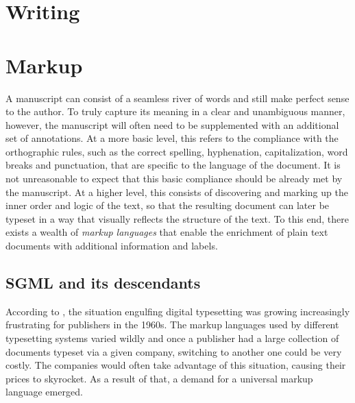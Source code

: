 \documentclass[b5paper]{book}
\begin{document}
    \chapter{Writing}

    \chapter{Markup}
      A manuscript can consist of a seamless river of words and still make
      perfect sense to the author. To truly capture its meaning in a clear and
      unambiguous manner, however, the manuscript will often need to be
      supplemented with an additional set of annotations. At a more basic level,
      this refers to the compliance with the orthographic rules, such as the
      correct spelling, hyphenation, capitalization, word breaks and
      punctuation, that are specific to the language of the document. It is not
      unreasonable to expect that this basic compliance should be already met by
      the manuscript. At a higher level, this consists of discovering and
      marking up the inner order and logic of the text, so that the resulting
      document can later be typeset in a way that visually reflects the
      structure of the text. To this end, there exists a wealth of \emph{markup
      languages} that enable the enrichment of plain text documents with
      additional information and labels.

      \section{SGML and its descendants}
        According to \cite{hlava11}, the situation engulfing digital typesetting
        was growing increasingly frustrating for publishers in the 1960s. The
        markup languages used by different typesetting systems varied wildly and
        once a publisher had a large collection of documents typeset via a given
        company, switching to another one could be very costly. The companies
        would often take advantage of this situation, causing their prices to
        skyrocket. As a result of that, a demand for a universal markup language
        emerged.
\end{document}
